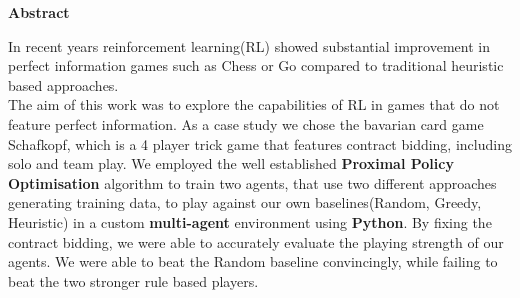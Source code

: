 %
%
\vspace*{2cm}

\begin{center}
    \textbf{Abstract}
\end{center}

\vspace*{1cm}

\noindent In recent years reinforcement learning(RL) showed substantial improvement in perfect information games such
as Chess or Go compared to traditional heuristic based approaches.\\
The aim of this work was to explore the capabilities of RL in games that do not feature perfect information.
As a case study we chose the bavarian card game Schafkopf, which is a 4 player trick game that features contract
bidding, including solo and team play.
We employed the well established \textbf{Proximal Policy Optimisation} algorithm to train two agents, that use two
different approaches generating training data, to play against our own baselines(Random, Greedy, Heuristic) in a custom
\textbf{multi-agent} environment using \textbf{Python}.
By fixing the contract bidding, we were able to accurately evaluate the playing strength of our agents.
We were able to beat the Random baseline convincingly, while failing to beat the two stronger rule based players.
